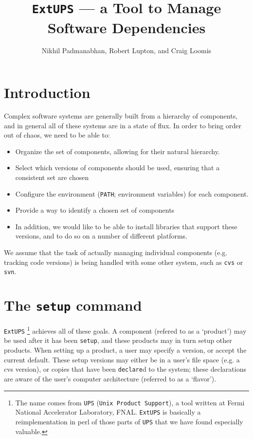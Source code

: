\documentclass{article}
\newcommand{\code}[1]{\texttt{#1}}
\newcommand{\eups}{\code{ExtUPS}}
\begin{document}
\title{\eups{} --- a Tool to Manage Software Dependencies}
\author{Nikhil Padmanabhan, Robert Lupton, and Craig Loomis}

\maketitle

\tableofcontents
\newpage


\section{Introduction}

Complex software systems are generally built from a hierarchy of
components, and in general all of these systems are in a state of
flux.  In order to bring order out of chaos, we need to be able to:
\begin{itemize}
  \item Organize the set of components, allowing for their natural
    hierarchy.

  \item
    Select which versions of components should be used, ensuring
    that a consistent set are chosen

  \item
    Configure the environment (\code{PATH}; environment variables)
    for each component.

  \item
    Provide a way to identify a chosen set of components

  \item
    In addition, we would like to be able to install libraries that support
    these versions, and to do so on a number of different platforms.
\end{itemize}

We assume that the task of actually managing individual components
(e.g. tracking code versions) is being handled with some other system,
such as \code{cvs} or \code{svn}.

\section{The \code{setup} command}

\eups
\footnote{%
  The name comes from \code{UPS} (\code{Unix Product Support}), a
  tool written at Fermi National Accelerator Laboratory, FNAL. \eups{}
  is basically a reimplementation in perl of those parts of \code{UPS}
  that we have found especially valuable.}
achieves all of these goals. A component (refered to as a `product')
may be used after it has been \code{setup}, and these products may
in turn setup other products. When setting up a product, a user
may specify a version, or accept the current default. These setup versions
may either be in a user's file space (e.g. a cvs version), or copies
that have been \code{declare}d to the system; these declarations are
aware of the user's computer architecture (referred to as a `flavor').
\end{document}
